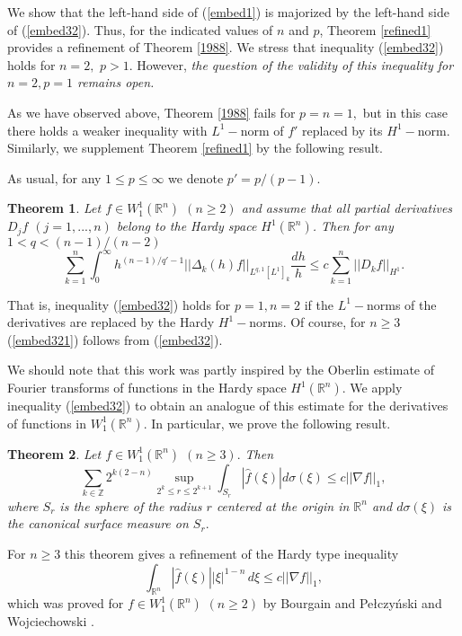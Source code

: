 \documentclass[12pt,twoside,reqno]{amsart}
\numberwithin{equation}{section}
\newtheorem{teo}{Theorem}[section]
\theoremstyle{definition}
\numberwithin{equation}{section}
\def\R{\mathbb{R}}
\def\Z{\mathbb{Z}}
\def\s{\sigma}
\def\D{\Delta}
\begin{document}
We show that the left-hand side of (\ref{embed1}) is majorized by the left-hand side of (\ref{embed32}). Thus, for the indicated values of $n$ and $p$, Theorem \ref{refined1} provides a refinement of Theorem \ref{1988}. We stress that inequality (\ref{embed32}) holds for $n=2,$  $p>1$. However, {\it the question of the validity
 of  this inequality for $n=2, p=1$ remains open.}

As we have observed above, Theorem \ref{1988} fails for $p=n=1,$ but  in this case there holds a weaker inequality  with $L^1-$norm of $f'$ replaced by  its $H^1-$norm. Similarly, we supplement Theorem \ref{refined1} by the following result.

As usual, for any $1\le p\le \infty$ we denote $p'=p/(p-1).$
\begin{teo}\label{hardy_refined}
Let $f\in W_1^1(\R^n)$ $(n\ge 2)$ and assume that all  partial derivatives $D_jf$ $(j=1,...,n)$ belong to the Hardy space $H^1(\R^n)$. Then for any $1<q<(n-1)/(n-2)$
\begin{equation}\label{embed321}
\sum_{k=1}^n \int_0^\infty h^{(n-1)/q'-1}||\D_k(h)f||_{L^{q,1}[L^1]_k}\frac{dh}{h}\le c \sum_{k=1}^n||D_kf||_{H^1}.
\end{equation}
\end{teo}
That is,
inequality  (\ref{embed32}) holds for $p=1, n=2$ if the $L^1-$norms of the derivatives are replaced by the Hardy $H^1-$norms.
Of course, for $n\ge 3$ (\ref{embed321}) follows from (\ref{embed32}).

We should note that this work was partly inspired by the Oberlin estimate \cite{Ober} of Fourier transforms of functions  in the Hardy space $H^1(\R^n).$
We apply inequality (\ref{embed32}) to obtain an analogue of this estimate for the derivatives of functions in $W_1^1(\R^n)$. In particular, we prove the following result.
\begin{teo}\label{Obertype100} Let $f\in W_1^1(\R^n)$ $(n\ge 3).$ Then
\begin{equation}\label{obertype100}
 \sum_{k\in\Z} 2^{k(2-n)}\sup_{2^{k}\le r\le 2^{k+1}}\int_{S_r} |\widehat f(\xi)| d\s(\xi)\le c ||\nabla f||_1,
\end{equation}
where $S_r$ is the sphere of the radius $r$ centered at the origin in $\R^n$ and $d\s(\xi)$ is the canonical surface measure on $S_r.$
\end{teo}

For $n\ge 3$ this theorem gives a refinement of the Hardy type inequality
\begin{equation*}
\int_{\R^n} |\widehat{f}(\xi)||\xi|^{1-n}\,d\xi\le c
||\nabla f||_1,
\end{equation*}
which was proved for $f\in W_1^1(\R^n) \,\, (n\ge 2)$ by
Bourgain \cite{Bour1}  and  Pe\l czy\'nski and  Wojciechowski
\cite{PeWo}.
\end{document}
